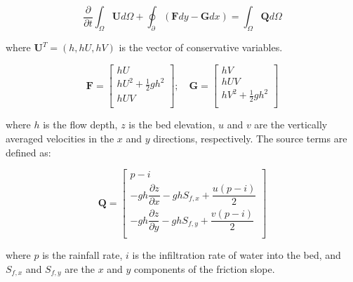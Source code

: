 \documentclass{article}
\begin{document}
\begin{equation}
	\dfrac{\partial}{\partial t} \int_\Omega \mathbf{U} d\Omega + \oint_\partial (\mathbf{F} dy - \mathbf{G} dx ) = \int_\Omega \mathbf{Q} d\Omega
\end{equation}

where $\mathbf{U}^T = (h, hU, hV) $ is the vector of conservative variables. 


\[ \mathbf{F} = 
\begin{bmatrix}
	h U  \\
	h U^2 + \frac{1}{2} g h^2 \\
	h U V \\
\end{bmatrix}  ; \quad
\mathbf{G} = 
\begin{bmatrix}
	h V \\
	h U V \\
	h V^2 + \frac{1}{2} g h^2 \\	
\end{bmatrix}  
\]

where $h$ is the flow depth,  $z$ is the bed elevation, $u$ and $v$ are the vertically averaged velocities in the $x$ and $y$ directions, respectively. 
The source terms are defined as:


 \[ \mathbf{Q} = 
 \begin{bmatrix}
	p - i  \\[.1cm]
	- g h \dfrac{\partial z}{\partial x} - g h  S_{f,x} + \dfrac{u(p-i)}{2}\\[.1cm]
	- g h \dfrac{\partial z}{\partial y} - g h  S_{f,y} + \dfrac{v(p-i)}{2}\\[.1cm]
\end{bmatrix} 
\]

where $p$ is the rainfall rate,   $i$ is the infiltration rate of water into the bed, and $S_{f,x}$ and $S_{f,y}$ are the $x$ and $y$ components of the friction slope. 
\end{document}
